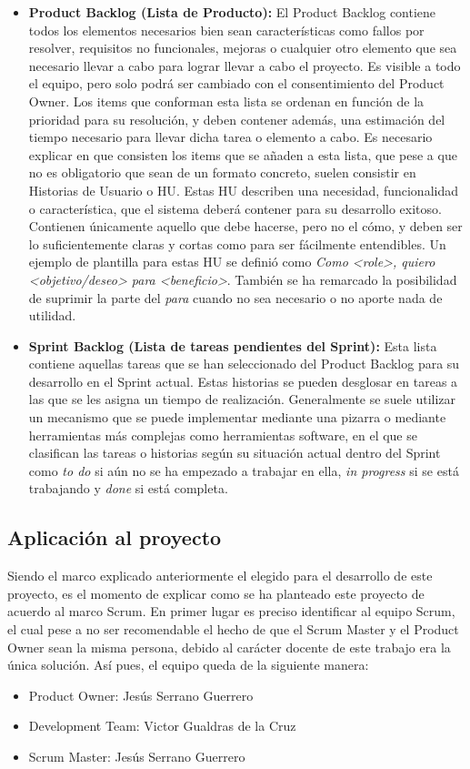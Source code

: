 \begin{itemize}
\item \textbf{Product Backlog (Lista de Producto):} El Product Backlog contiene todos los elementos necesarios bien sean características como fallos por resolver, requisitos no funcionales, mejoras o cualquier otro elemento que sea necesario llevar a cabo para lograr llevar a cabo el proyecto. Es visible a todo el equipo, pero solo podrá ser cambiado con el consentimiento del Product Owner. Los items que conforman esta lista se ordenan en función de la prioridad para su resolución, y deben contener además, una estimación del tiempo necesario para llevar dicha tarea o elemento a cabo. Es necesario explicar en que consisten los items que se añaden a esta lista, que pese a que no es obligatorio que sean de un formato concreto, suelen consistir en Historias de Usuario o \acs{HU}. Estas \acs{HU} describen una necesidad, funcionalidad o característica, que el sistema deberá contener para su desarrollo exitoso. Contienen únicamente aquello que debe hacerse, pero no el cómo, y deben ser lo suficientemente claras y cortas como para ser fácilmente entendibles. Un ejemplo de plantilla para estas \acs{HU} se definió como \textit{Como <role>, quiero <objetivo/deseo> para <beneficio>}. También se ha remarcado la posibilidad de suprimir la parte del \textit{para} cuando no sea necesario o no aporte nada de utilidad. 

\item \textbf{Sprint Backlog (Lista de tareas pendientes del Sprint):} Esta lista contiene aquellas tareas que se han seleccionado del Product Backlog para su desarrollo en el Sprint actual. Estas historias se pueden desglosar en tareas a las que se les asigna un tiempo de realización. Generalmente se suele utilizar un mecanismo que se puede implementar mediante una pizarra o mediante herramientas más complejas como herramientas software, en el que se clasifican las tareas o historias según su situación actual dentro del Sprint como \textit{to do} si aún no se ha empezado a trabajar en ella, \textit{in progress} si se está trabajando y \textit{done} si está completa.
\end{itemize}

\subsection{Aplicación al proyecto} 

Siendo el marco explicado anteriormente el elegido para el desarrollo de este proyecto, es el momento de explicar como se ha planteado este proyecto de acuerdo al marco Scrum.
En primer lugar es preciso identificar al equipo Scrum, el cual pese a no ser recomendable el hecho de que el Scrum Master y el Product Owner sean la misma persona, debido al carácter docente de este trabajo era la única solución. Así pues, el equipo queda de la siguiente manera:
\begin{itemize}
\item Product Owner: Jesús Serrano Guerrero
\item Development Team: Victor Gualdras de la Cruz
\item Scrum Master: Jesús Serrano Guerrero
\end{itemize}

